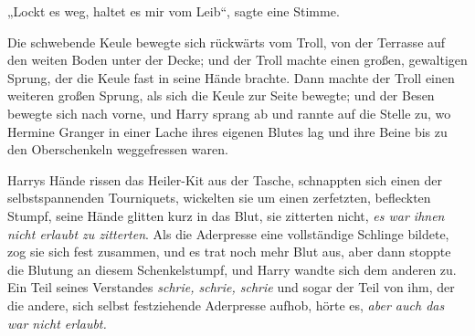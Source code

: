 „Lockt es weg, haltet es mir vom Leib“, sagte eine Stimme.

Die schwebende Keule bewegte sich rückwärts vom Troll, von der Terrasse auf den weiten Boden unter der Decke; und der Troll machte einen großen, gewaltigen Sprung, der die Keule fast in seine Hände brachte. Dann machte der Troll einen weiteren großen Sprung, als sich die Keule zur Seite bewegte; und der Besen bewegte sich nach vorne, und Harry sprang ab und rannte auf die Stelle zu, wo Hermine Granger in einer Lache ihres eigenen Blutes lag und ihre Beine bis zu den Oberschenkeln weggefressen waren.

Harrys Hände rissen das Heiler-Kit aus der Tasche, schnappten sich einen der selbstspannenden Tourniquets, wickelten sie um einen zerfetzten, befleckten Stumpf, seine Hände glitten kurz in das Blut, sie zitterten nicht, \emph{es war ihnen nicht erlaubt zu zitterten}. Als die Aderpresse eine vollständige Schlinge bildete, zog sie sich fest zusammen, und es trat noch mehr Blut aus, aber dann stoppte die Blutung an diesem Schenkelstumpf, und Harry wandte sich dem anderen zu. Ein Teil seines Verstandes \emph{schrie, schrie, schrie} und sogar der Teil von ihm, der die andere, sich selbst festziehende Aderpresse aufhob, hörte es, \emph{aber auch das war nicht erlaubt.}

